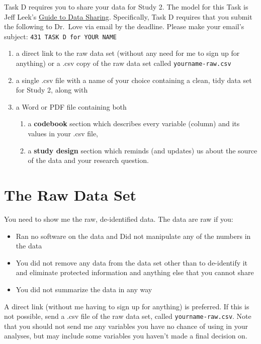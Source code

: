 \documentclass[]{book}
\providecommand{\tightlist}{%
  \setlength{\itemsep}{0pt}\setlength{\parskip}{0pt}}
\theoremstyle{definition}
\theoremstyle{definition}
\theoremstyle{definition}
\theoremstyle{remark}
\begin{document}
Task D requires you to share your data for Study 2. The model for this
Task is Jeff Leek's \href{https://github.com/jtleek/datasharing}{Guide
to Data Sharing}. Specifically, Task D requires that you submit the
following to Dr.~Love via email by the deadline. Please make your
email's subject: \texttt{431\ TASK\ D\ for\ YOUR\ NAME}

\begin{enumerate}
\def\labelenumi{\arabic{enumi}.}
\tightlist
\item
  a direct link to the raw data set (without any need for me to sign up
  for anything) or a .csv copy of the raw data set called
  \texttt{yourname-raw.csv}
\item
  a single .csv file with a name of your choice containing a clean, tidy
  data set for Study 2, along with
\item
  a Word or PDF file containing both

  \begin{enumerate}
  \def\labelenumii{\alph{enumii}.}
  \tightlist
  \item
    a \textbf{codebook} section which describes every variable (column)
    and its values in your .csv file,
  \item
    a \textbf{study design} section which reminds (and updates) us about
    the source of the data and your research question.
  \end{enumerate}
\end{enumerate}

\hypertarget{the-raw-data-set}{%
\section{The Raw Data Set}\label{the-raw-data-set}}

You need to show me the raw, de-identified data. The data are raw if
you:

\begin{itemize}
\tightlist
\item
  Ran no software on the data and Did not manipulate any of the numbers
  in the data
\item
  You did not remove any data from the data set other than to
  de-identify it and eliminate protected information and anything else
  that you cannot share
\item
  You did not summarize the data in any way
\end{itemize}

A direct link (without me having to sign up for anything) is preferred.
If this is not possible, send a .csv file of the raw data set, called
\texttt{yourname-raw.csv}. Note that you should not send me any
variables you have no chance of using in your analyses, but may include
some variables you haven't made a final decision on.
\end{document}
